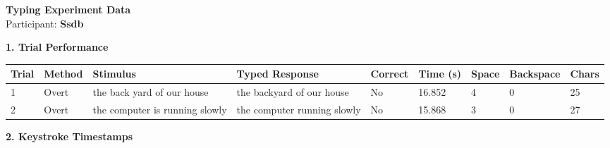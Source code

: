 \documentclass[10pt,a4paper]{article}
\begin{document}

\begin{center}
    {\Large\bfseries Typing Experiment Data}\\
    \vspace{2pt}
    Participant: \textbf{Ssdb}
\end{center}

\vspace{0.25cm}


\noindent
{\large\bfseries 1. Trial Performance}

\vspace{0.08cm}

\begin{center}
\begin{tabularx}{\textwidth}{
    C{0.45in}
    C{0.65in}
    L{2.35in}
    L{2.55in}
    C{0.65in}
    C{0.65in}
    C{0.55in}
    C{0.75in}
    C{0.55in}
}
\toprule

\textbf{Trial} &
\textbf{Method} &
\textbf{Stimulus} &
\textbf{Typed Response} &
\textbf{Correct} &
\textbf{Time (s)} &
\textbf{Space} &
\textbf{Backspace} &
\textbf{Chars}
\\

\midrule

1 &
Overt &
the back yard of our house &
the backyard of our house &
No &
16.852 &
4 &
0 &
25
\\

2 &
Overt &
the computer is running slowly &
the computer running slowly &
No &
15.868 &
3 &
0 &
27
\\

\bottomrule
\end{tabularx}
\end{center}

\vspace{0.35cm}


\noindent
{\large\bfseries 2. Keystroke Timestamps}

\vspace{0.08cm}
\end{document}
